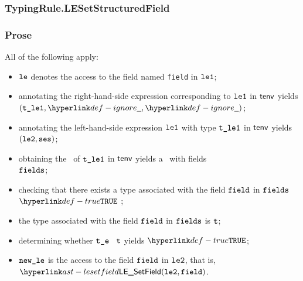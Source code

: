 \subsubsection{TypingRule.LESetStructuredField\label{sec:TypingRule.LESetStructuredField}}
\subsubsection{Prose}
All of the following apply:
\begin{itemize}
  \item $\texttt{le}$ denotes the access to the field named \texttt{field} in $\texttt{le1}$;
  \item annotating the right-hand-side expression corresponding to $\texttt{le1}$ in $\textsf{tenv}$ yields \\ $(\vtleone, \Ignore, \Ignore)$\ProseOrTypeError;
  \item annotating the left-hand-side expression  $\texttt{le1}$ with type $\texttt{t\_le1}$ in $\textsf{tenv}$ yields \\ $(\texttt{le2}, \texttt{ses})$\ProseOrTypeError;
  \item obtaining the \underlyingtype\ of $\texttt{t\_le1}$ in $\textsf{tenv}$ yields a \structuredtype\ with fields \\
        $\texttt{fields}$\ProseOrTypeError;
  \item checking that there exists a type associated with the field $\texttt{field}$ in $\texttt{fields}$ $\True$ \ProseTerminateAs{\MissingField};
  \item the type associated with the field $\texttt{field}$ in $\texttt{fields}$ is $\texttt{t}$;
  \item determining whether $\texttt{t\_e}$ \typesatisfies\ $\texttt{t}$ yields $\True$\ProseOrTypeError;
  \item $\texttt{new\_le}$ is the access to the field $\texttt{field}$ in $\texttt{le2}$, that is, $\LESetField(\vletwo, \field)$.
\end{itemize}
